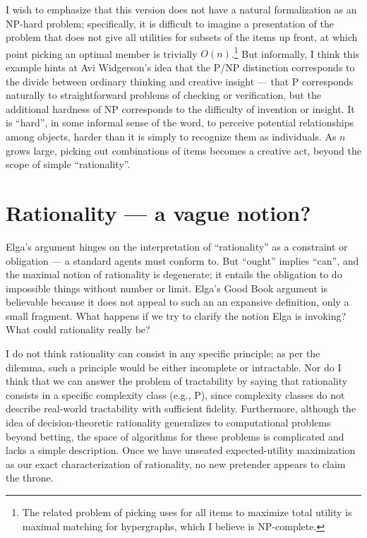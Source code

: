 \documentclass[letterpaper,12pt]{article}
\begin{document}
I wish to emphasize that this version does not have a natural formalization as an NP-hard problem; specifically, it is difficult to imagine a presentation of the problem that does not give all utilities for subsets of the items up front, at which point picking an optimal member is trivially $O(n)$.\footnote{The related problem of picking uses for all items to maximize total utility is maximal matching for hypergraphs, which I believe is NP-complete.} But informally, I think this example hints at Avi Widgerson's idea \citeyearpar{widgerson2009creativity} that the P/NP distinction corresponds to the divide between ordinary thinking and creative insight --- that P corresponds naturally to straightforward problems of checking or verification, but the additional hardness of NP corresponds to the difficulty of invention or insight. It is ``hard'', in some informal sense of the word, to perceive potential relationships among objects, harder than it is simply to recognize them as individuals. As $n$ grows large, picking out combinations of items becomes a creative act, beyond the scope of simple ``rationality''.

\section{Rationality --- a vague notion?}
Elga's argument hinges on the interpretation of ``rationality'' as a constraint or obligation --- a standard agents must conform to. But ``ought'' implies ``can'', and the maximal notion of rationality is degenerate; it entails the obligation to do impossible things without number or limit. Elga's Good Book argument is believable because it does not appeal to such an an expansive definition, only a small fragment. What happens if we try to clarify the notion Elga is invoking? What could rationality really be?

I do not think rationality can consist in any specific principle; as per the dilemma, such a principle would be either incomplete or intractable. Nor do I think that we can answer the problem of tractability by saying that rationality consists in a specific complexity class (e.g., P), since complexity classes do not describe real-world tractability with sufficient fidelity. Furthermore, although the idea of decision-theoretic rationality generalizes to computational problems beyond betting, the space of algorithms for these problems is complicated and lacks a simple description. Once we have unseated expected-utility maximization as our exact characterization of rationality, no new pretender appears to claim the throne.
\end{document}
